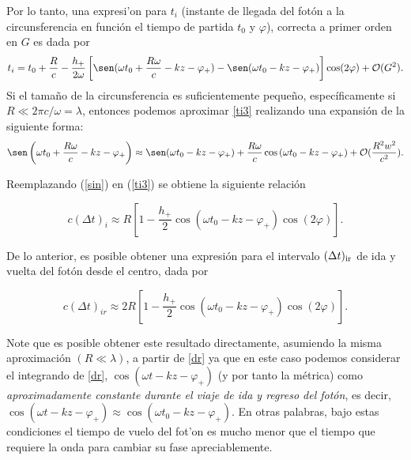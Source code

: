 Por lo tanto, una expresi'on para $t_i$ (instante de llegada del fot\'on a la circunsferencia en funci\'on el tiempo de partida $t_0$ y $\varphi$), correcta a primer orden en $G$ es dada por
\begin{equation}
t_i=t_0+\frac{R}{c}-\frac{h_+}{2\omega}\left[\sen(\omega t_0+\frac{R\omega}{c}-kz-\varphi_+)-\sen(\omega t_0-kz-\varphi_+)\right]\cos(2\varphi)+\mathcal{O}(G^2). \label{ti3}
\end{equation}
Si el tama\~no de la circunsferencia es suficientemente peque\~no, espec\'ificamente si $R\ll 2\pi c/\omega=\lambda$, entonces podemos aproximar \eqref{ti3} realizando una expansi\'on de la siguiente forma:
\begin{equation}
\sen\left(\omega t_0+\frac{R\omega}{c}-kz-\varphi_+\right)\approx \sen(\omega t_0-kz-\varphi_+)+\frac{R\omega}{c}\cos\left(\omega t_0-kz-\varphi_+ \right)+\mathcal{O}(\frac{R^2 w^2}{c^2}) .\label{sin}
\end{equation}

Reemplazando (\ref{sin}) en (\ref{ti3}) se obtiene la siguiente relaci\'on

\begin{equation}
c(\Delta t)_i\approx R\left[1-\frac{h_+}{2}\cos(\omega t_0-kz-\varphi_+)\cos(2\varphi) \right].
\end{equation}

De lo anterior, es posible obtener una expresi\'on para el intervalo $(\Delta t)_{\rm ir}$ de ida y vuelta del fot\'on desde el centro, dada por

\begin{equation}
c(\Delta t)_{ir}\approx 2R\left[1-\frac{h_+}{2}\cos(\omega t_0-kz-\varphi_+)\cos(2\varphi) \right]. \label{tir}
\end{equation}

Note que es posible obtener este resultado directamente, asumiendo la misma aproximaci\'on $(R\ll \lambda)$, a partir de \eqref{dr} ya que en este caso podemos considerar el integrando de \eqref{dr}, $\cos(\omega t-kz-\varphi_+)$ (y por tanto la m\'etrica) como \textit{aproximadamente constante durante el viaje de ida y regreso del fot\'on}, es decir, $\cos(\omega t-kz-\varphi_+)\approx \cos(\omega t_0-kz-\varphi_+)$. En otras palabras, bajo estas condiciones el tiempo de vuelo del fot'on es mucho menor que el tiempo que requiere la onda para cambiar su fase apreciablemente.

